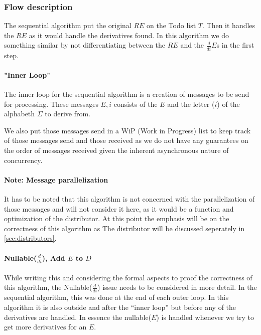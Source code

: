 \documentclass[a4paper,11pt]{report}
\begin{document}
\subsubsection{Flow description}
\label{sec:flow-description}



The sequential algorithm put the original $RE$ on the Todo list
$T$. Then it handles the $RE$ as it would handle the derivatives
found. In this algorithm we do something similar by not
differentiating between the $RE$ and the $\frac{d}{di}E$s in the first
step.

\paragraph{"Inner Loop"}
\label{sec:inner-loop}

The inner loop for the sequential algorithm is a creation of messages
to be send for processing. These messages ${E,i}$ consists of the $E$ and the
letter ($i$) of the alphabeth $\Sigma$ to derive from.

We also put those messages send in a WiP (Work in Progress) list to
keep track of those messages send and those received as we do not have
any guarantees on the order of messages received given the inherent
asynchronous nature of concurrency.

\paragraph{Note: Message parallelization}

It has to be noted that this algorithm is not concerned with the
parallelization of those messages and will not consider it here, as it
would be a function and optimization of the distributor. At this point
the emphasis will be on the correctness of this algorithm as
The
distributor will be discussed seperately in \ref{sec:distributors}.

\paragraph{Nullable($\frac{d}{di}$), Add $E$ to $D$}
\label{sec:nullablefracddi}
While writing this and considering the formal aspects to proof the
correctness of this algorithm, the Nullable($\frac{d}{di}$) issue
needs to be considered in more detail. In the sequential algorithm,
this was done at the end of each outer loop. In this algorithm it is
also outside and after the ``inner loop'' but before any of the
derivatives are handled. In essence the nullable($E$) is handled
whenever we try to get more derivatives for an $E$.
\end{document}
